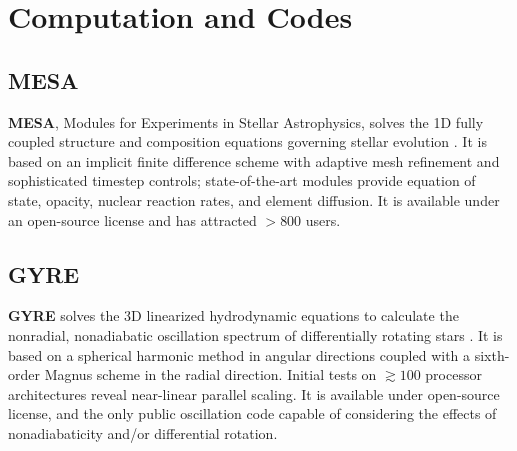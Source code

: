 \section{Computation and Codes}
    
    
{\color{green}    
\subsection{MESA}
}

\textbf{MESA}, Modules for Experiments in Stellar
Astrophysics, solves the 1D fully coupled structure and composition
equations governing stellar evolution . It
is based on an implicit finite difference scheme with adaptive mesh
refinement and sophisticated timestep controls; 
state-of-the-art modules provide equation of state, opacity, nuclear
reaction rates, and element diffusion.
It is 
available under an open-source license and has  attracted $>800$ 
 users.

    
    
{\color{brown}    
\subsection{GYRE}}
 \textbf{GYRE} solves the 3D linearized hydrodynamic
equations to calculate the nonradial, nonadiabatic oscillation
spectrum of differentially rotating stars \cite{2013MNRAS.435.3406T}. It is based
on a spherical harmonic method in angular directions coupled with a
sixth-order Magnus scheme in the radial direction. Initial tests on
$\gtrsim 100$ processor architectures reveal near-linear parallel
scaling. It is available under open-source license, and the only public oscillation code capable of
considering the effects of nonadiabaticity and/or differential
rotation.
